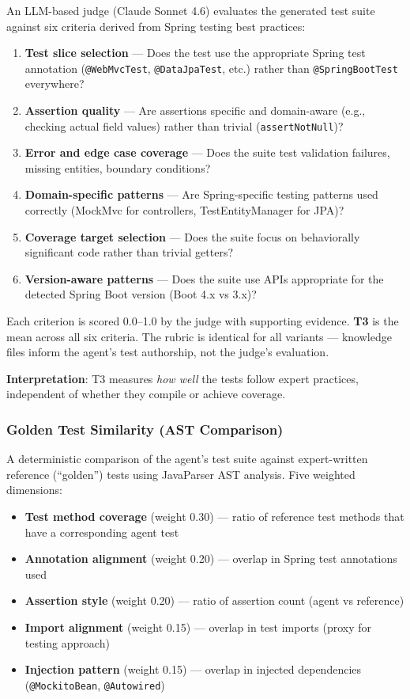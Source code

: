 \documentclass[11pt,a4paper]{article}
\begin{document}
An LLM-based judge (Claude Sonnet 4.6) evaluates the generated test suite against
six criteria derived from Spring testing best practices:

\begin{enumerate}
  \item \textbf{Test slice selection} --- Does the test use the appropriate Spring test annotation (\texttt{@WebMvcTest}, \texttt{@DataJpaTest}, etc.) rather than \texttt{@SpringBootTest} everywhere?
  \item \textbf{Assertion quality} --- Are assertions specific and domain-aware (e.g., checking actual field values) rather than trivial (\texttt{assertNotNull})?
  \item \textbf{Error and edge case coverage} --- Does the suite test validation failures, missing entities, boundary conditions?
  \item \textbf{Domain-specific patterns} --- Are Spring-specific testing patterns used correctly (MockMvc for controllers, TestEntityManager for JPA)?
  \item \textbf{Coverage target selection} --- Does the suite focus on behaviorally significant code rather than trivial getters?
  \item \textbf{Version-aware patterns} --- Does the suite use APIs appropriate for the detected Spring Boot version (Boot 4.x vs 3.x)?
\end{enumerate}

Each criterion is scored 0.0--1.0 by the judge with supporting evidence.
\textbf{T3} is the mean across all six criteria. The rubric is identical for
all variants --- knowledge files inform the agent's test authorship, not the
judge's evaluation.

\textbf{Interpretation}: T3 measures \emph{how well} the tests follow expert
practices, independent of whether they compile or achieve coverage.

\subsubsection{Golden Test Similarity (AST Comparison)}

A deterministic comparison of the agent's test suite against expert-written
reference (``golden'') tests using JavaParser AST analysis. Five weighted
dimensions:

\begin{itemize}
  \item \textbf{Test method coverage} (weight 0.30) --- ratio of reference test methods that have a corresponding agent test
  \item \textbf{Annotation alignment} (weight 0.20) --- overlap in Spring test annotations used
  \item \textbf{Assertion style} (weight 0.20) --- ratio of assertion count (agent vs reference)
  \item \textbf{Import alignment} (weight 0.15) --- overlap in test imports (proxy for testing approach)
  \item \textbf{Injection pattern} (weight 0.15) --- overlap in injected dependencies (\texttt{@MockitoBean}, \texttt{@Autowired})
\end{itemize}
\end{document}
